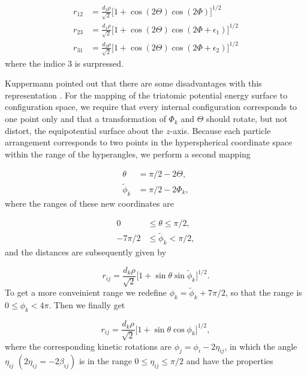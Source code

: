 \begin{equation}
\begin{aligned}
r_{12} &= \frac{d_3\rho}{\sqrt{2}}\big[1+\cos(2\Theta)\cos(2\Phi)\big]^{1/2}\\
r_{23} &= \frac{d_1\rho}{\sqrt{2}}\big[1 + \cos(2\Theta)\cos(2\Phi + \epsilon_1)\big]^{1/2}\\
r_{31} &= \frac{d_2\rho}{\sqrt{2}}\big[1 + \cos(2\Theta)\cos(2\Phi + \epsilon_2)\big]^{1/2}
\end{aligned}
\end{equation}
where the indice $3$ is surpressed.

Kuppermann pointed out that there are some disadvantages with this representation \cite{KUPPERMANN1975374}. For the mapping of the triatomic potential energy surface to configuration space, we require that every internal configuration corresponds to one point only and that a transformation of $\Phi_k$ and $\Theta$ should rotate, but not distort, the equipotential surface about the $z$-axis. Because each particle arrangement corresponds to two points in the hyperspherical coordinate space within the range of the hyperangles, we perform a second mapping

\begin{equation}
\begin{aligned}
\theta &= \pi/2-2\Theta,\\
\tilde{\phi}_k &= \pi/2-2\Phi_k,
\end{aligned}
\end{equation}
where the ranges of these new coordinates are 

\begin{equation}
\begin{aligned}
0  &\leq \theta \leq \pi/2,\\
-7\pi/2 &\leq \tilde{\phi}_k < \pi/2,
\end{aligned}
\end{equation} 
and the distances are subsequently given by

\begin{equation}
r_{ij} = \frac{d_k\rho}{\sqrt{2}}\big[1 + \sin\theta\sin\tilde{\phi}_k\big]^{1/2}.
\end{equation}
To get a more conveinient range we redefine $\phi_k = \tilde{\phi}_k+7\pi/2$, so that the range is $0 \leq \phi_k < 4\pi$. Then we finally get

\begin{equation}
r_{ij} = \frac{d_k\rho}{\sqrt{2}}\big[1 + \sin\theta\cos\phi_k\big]^{1/2},
\end{equation}
where the corresponding kinetic rotations are $\phi_j=\phi_i-2\eta_{ij}$, in which the angle $\eta_{ij}$ $(2\eta_{ij} = -2\beta_{ij})$ is in the range $0 \leq \eta_{ij} \leq \pi/2$ and have the properties

